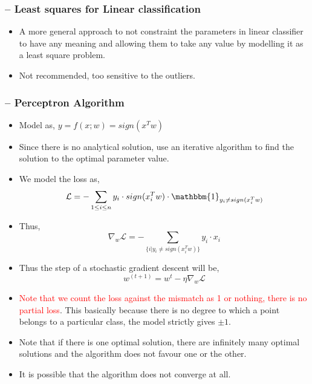\documentclass{article}
\newcommand{\red}[1]{\textcolor{red}{#1}}
\begin{document}
\subsubsection{-- Least squares for Linear classification}

\begin{itemize}
    \item A more general approach to not constraint the parameters in linear classifier to have any meaning and allowing them to take any value by modelling it as a least square problem.
    \item Not recommended, too sensitive to the outliers.
    
\end{itemize}

\subsubsection{-- Perceptron Algorithm}
\begin{itemize}
    \item Model as, $y = f(x;w) = sign(x^Tw)$
    \item Since there is no analytical solution, use an iterative algorithm to find the solution to the optimal parameter value.
    \item We model the loss as, $$\mathcal{L} = -\sum_{1 \leq i \leq n}{ y_i\cdot sign(x_i^Tw)}\cdot \mathbbm{1}_{y_i \neq sign(x_i^Tw)}$$
    \item Thus, $$\nabla_w{\mathcal{L}} = -\sum_{\{i | {y_i \neq sign(x_i^Tw)}\}}{ y_i\cdot x_i}$$
    \item Thus the step of a stochastic gradient descent will be, $$w^{(t+1)} = w^t - \eta\nabla_w{\mathcal{L}}$$
    \item \red{Note that we count the loss against the mismatch as 1 or nothing, there is no partial loss}. This basically because there is no degree to which a point belongs to a particular class, the model strictly gives $\pm1$.
    \item Note that if there is one optimal solution, there are infinitely many optimal solutions and the algorithm does not favour one or the other.
    \item It is possible that the algorithm does not converge at all.
\end{itemize}
\end{document}

